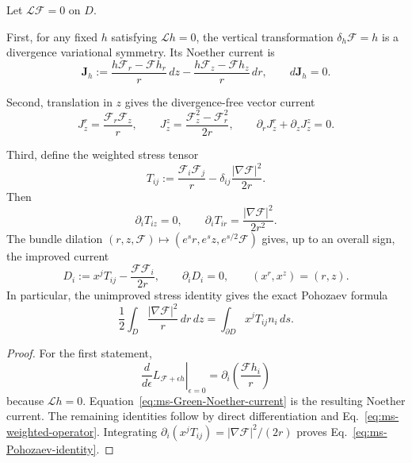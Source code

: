 \begin{proposition}
\label{prop:ms-Noether-currents}
Let $\mathcal L\mathcal F=0$ on $D$.

First, for any fixed $h$ satisfying $\mathcal Lh=0$, the vertical
transformation $\delta_h\mathcal F=h$ is a divergence variational symmetry.
Its Noether current is
\begin{equation}
\boldsymbol J_h
:=\frac{h\mathcal F_r-\mathcal Fh_r}{r}\,dz
-\frac{h\mathcal F_z-\mathcal Fh_z}{r}\,dr,
\qquad
d\boldsymbol J_h=0.
\label{eq:ms-Green-Noether-current}
\end{equation}

Second, translation in $z$ gives the divergence-free vector current
\begin{equation}
J_z^r=\frac{\mathcal F_r\mathcal F_z}{r},
\qquad
J_z^z=\frac{\mathcal F_z^2-\mathcal F_r^2}{2r},
\qquad
\partial_rJ_z^r+\partial_zJ_z^z=0.
\label{eq:ms-z-Noether-current}
\end{equation}

Third, define the weighted stress tensor
\begin{equation}
T_{ij}
:=\frac{\mathcal F_i\mathcal F_j}{r}
-\delta_{ij}\frac{|\nabla\mathcal F|^2}{2r}.
\label{eq:ms-stress-tensor}
\end{equation}
Then
\begin{equation}
\partial_iT_{iz}=0,
\qquad
\partial_iT_{ir}=\frac{|\nabla\mathcal F|^2}{2r^2}.
\label{eq:ms-stress-divergence}
\end{equation}
The bundle dilation $(r,z,\mathcal F)\mapsto
(e^s r,e^s z,e^{s/2}\mathcal F)$ gives, up to an overall sign, the improved
current
\begin{equation}
D_i:=x^jT_{ij}-\frac{\mathcal F\mathcal F_i}{2r},
\qquad
\partial_iD_i=0,
\qquad
(x^r,x^z)=(r,z).
\label{eq:ms-dilation-current}
\end{equation}
In particular, the unimproved stress identity gives the exact Pohozaev
formula
\begin{equation}
\frac12\int_D\frac{|\nabla\mathcal F|^2}{r}\,dr\,dz
=\int_{\partial D}x^jT_{ij}n_i\,ds.
\label{eq:ms-Pohozaev-identity}
\end{equation}
\end{proposition}

\begin{proof}
For the first statement,
\begin{equation}
\left.\frac{d}{d\epsilon}L_{\mathcal F+\epsilon h}
\right|_{\epsilon=0}
=\partial_i\!\left(\frac{\mathcal Fh_i}{r}\right)
\end{equation}
because $\mathcal Lh=0$. Equation~\eqref{eq:ms-Green-Noether-current} is
the resulting Noether current. The remaining identities follow by direct
differentiation and Eq.~\eqref{eq:ms-weighted-operator}. Integrating
$\partial_i(x^jT_{ij})=|\nabla\mathcal F|^2/(2r)$ proves
Eq.~\eqref{eq:ms-Pohozaev-identity}.
\end{proof}

